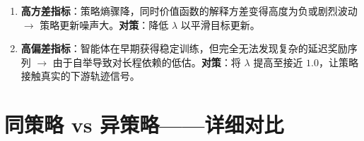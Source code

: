 \begin{enumerate}
  \item \textbf{高方差指标}：策略熵骤降，同时价值函数的解释方差变得高度为负或剧烈波动 $\rightarrow$ 策略更新噪声大。\textbf{对策}：降低 $\lambda$ 以平滑目标更新。
  \item \textbf{高偏差指标}：智能体在早期获得稳定训练，但完全无法发现复杂的延迟奖励序列 $\rightarrow$ 由于自举导致对长程依赖的低估。\textbf{对策}：将 $\lambda$ 提高至接近 $1.0$，让策略接触真实的下游轨迹信号。
\end{enumerate}

\section{同策略 vs 异策略——详细对比}
\label{on-policy-vs-off-policy-detailed-comparison}

